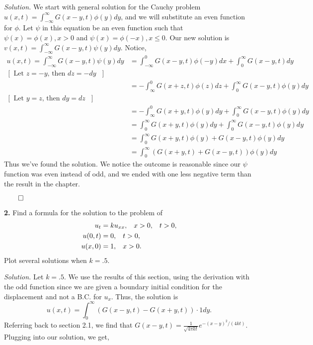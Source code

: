 \documentclass{article}
\begin{document}
\vspace{3mm}
\textit{Solution.}  We start with general solution for the Cauchy problem \(u(x,t)=\int_{-\infty}^\infty G(x-y,t) \phi(y) dy \), and we will substitute an even function for \(\phi\). Let \(\psi \) in this equation be an even function such that \( \psi(x) = \phi(x), x>0 \) and \(\psi(x) = \phi(-x), x \leq 0 \). Our new solution is \(v(x,t)=\int_{-\infty}^\infty G(x-y,t) \psi(y) dy \). Notice,
\begin{align*}
u(x,t)=\int_{-\infty}^\infty G(x-y,t) \psi(y) dy &= \int_{-\infty}^0 G(x-y,t)\phi(-y) dx + \int_0^{\infty} G(x-y,t) dy\\
[\text{ Let \(z=-y\), then \(dz = -dy\) } ]\\
&= -\int_{\infty}^0 G(x+z,t) \phi(z) dz + \int_0^{\infty} G(x-y,t) \phi(y) dy \\
[\text{ Let \(y=z\), then \(dy=dz\) } ]\\
&= -\int_{\infty}^0 G(x+y,t) \phi(y) dy + \int_0^{\infty} G(x-y,t) \phi(y) dy \\
&= \int_0^{\infty} G(x+y,t) \phi(y) dy + \int_0^{\infty} G(x-y,t) \phi(y) dy \\
&=\int_0^{\infty}  G(x+y,t) \phi(y) +G(x-y,t) \phi(y) dy \\
&=\int_0^{\infty}  \left( G(x+y,t)  +G(x-y,t)\right) \phi(y) dy 
\end{align*}
Thus we've found the solution. We notice the outcome is reasonable since our \(\psi\) function was even instead of odd, and we ended with one less negative term than the result in the chapter. 
\begin{flushright}
\( \qed\)
\end{flushright}



\newpage

\textbf{2.} Find a formula for the solution to the problem of
\begin{align*}
u_t &= ku_{xx}, \hspace{3mm} x>0, \hspace{3mm} t>0, \\
u(0,t) &= 0, \hspace{3mm} t>0, \\
u(x,0)&=1, \hspace{3mm} x>0. 
\end{align*}
Plot several solutions when \(k=.5\). 

\vspace{2mm}
\textit{Solution.} Let \(k=.5\). We use the results of this section, using the derivation with the odd function since we are given a boundary initial condition for the displacement and not a B.C. for \(u_x\). Thus, the solution is 
\[u(x,t) = \int_0^{\infty} ( G(x-y,t) - G(x+y,t) ) \cdot 1 dy. \] Referring back to section 2.1, we find that \(G(x-y,t) = \frac{1}{\sqrt{4\pi kt}} e^{-(x-y)^2/(4kt)} \). Plugging into our solution, we get, 
\end{document}
